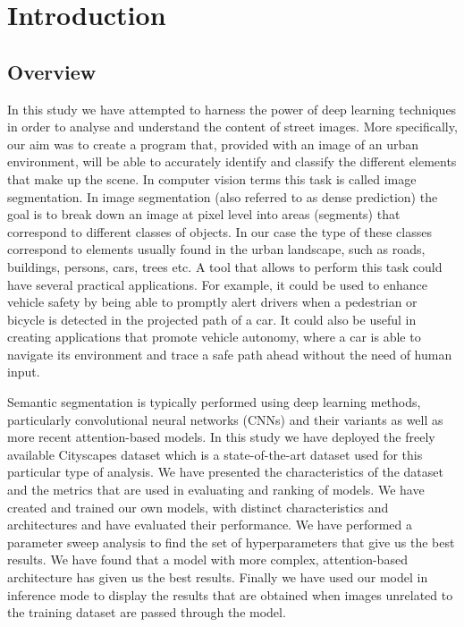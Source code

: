 \section{Introduction}
\subsection{Overview}

In this study we have attempted to harness the power of deep learning techniques in order to analyse and understand the content of street images. More specifically, our aim was to create a program that, provided with an image of an urban environment, will be able to accurately identify and classify the different elements that make up the scene. In computer vision terms this task is called image segmentation. In image segmentation (also referred to as dense prediction) the goal is to break down an image at pixel level into areas (segments) that correspond to different classes of objects. In our case the type of these classes correspond to elements usually found in the urban landscape, such as roads, buildings, persons, cars, trees etc. A tool that allows to perform this task could have several practical applications. For example, it could be used to enhance vehicle safety by being able to promptly alert drivers when a pedestrian or bicycle is detected in the projected path of a car. It could also be useful in creating applications that promote vehicle autonomy, where a car is able to navigate its environment and trace a safe path ahead without the need of human input. 

Semantic segmentation is typically performed using deep learning methods, particularly convolutional neural networks (CNNs) and their variants as well as more recent attention-based models. In this study we have deployed the freely available Cityscapes dataset \cite{DBLP:journals/corr/CordtsORREBFRS16} which is a state-of-the-art dataset used for this particular type of analysis. We have presented the characteristics of the dataset and the metrics that are used in evaluating and ranking of models. We have created and trained our own models, with distinct characteristics and architectures and have evaluated their performance. We have performed a parameter sweep analysis to find the set of hyperparameters that give us the best results. We have found that a model with more complex, attention-based architecture has given us the best results. Finally we have used our model in inference mode to display the results that are obtained when images unrelated to the training dataset are passed through the model.

